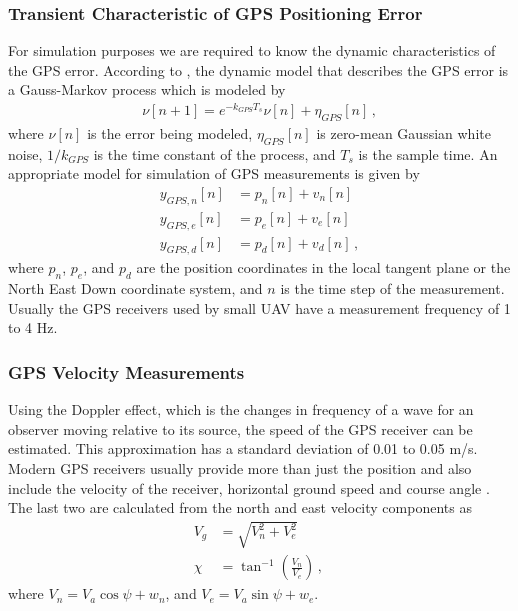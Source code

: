 \subsubsection{Transient Characteristic of GPS Positioning Error}
For simulation purposes we are required to know the dynamic characteristics of the GPS error. According to \cite{Rankin1994}, the dynamic model that describes the GPS error is a Gauss-Markov process which is modeled by
\begin{align}
\nu[n+1]=e^{-k_{GPS}T_s}\nu[n]+\eta_{GPS}[n]\,,
\end{align}
where \begin{math} \nu[n] \end{math} is the error being modeled, \begin{math} \eta_{GPS}[n] \end{math} is zero-mean Gaussian white noise, \begin{math} 1/k_{GPS} \end{math} is the time constant of the process, and \begin{math} T_s \end{math} is the sample time. An appropriate model for simulation of GPS measurements is given by
\begin{align}
y_{GPS,n}[n]&=p_n[n]+v_n[n]\\
y_{GPS,e}[n]&=p_e[n]+v_e[n]\\
y_{GPS,d}[n]&=p_d[n]+v_d[n]\,,
\end{align}
where \begin{math}p_n\end{math}, \begin{math}p_e\end{math}, and \begin{math} p_d\end{math} are the position coordinates in the local tangent plane or the North East Down coordinate system, and \begin{math} n \end{math} is the time step of the measurement. Usually the GPS receivers used by small UAV have a measurement frequency of 1 to 4 Hz.

\subsubsection{GPS Velocity Measurements}
Using the Doppler effect, which is the changes in frequency of a wave for an observer moving relative to its source, the speed of the GPS receiver can be estimated. This approximation has a standard deviation of 0.01 to 0.05 m/s. Modern GPS receivers usually provide more than just the position and also include the velocity of the receiver, horizontal ground speed and course angle \cite{Beard2010}.
The last two are calculated from the north and east velocity components as
\begin{align}
V_g&=\sqrt{V_n^2+V_e^2} \label{eq:Vg}\\
\chi&=\tan^{-1}\left(\frac{V_n}{V_e}\right)\,,\label{eq:chi}\,
\end{align}
where $ V_n=V_a\cos\psi+w_n $, and $ V_e=V_a\sin\psi+w_e $. 

